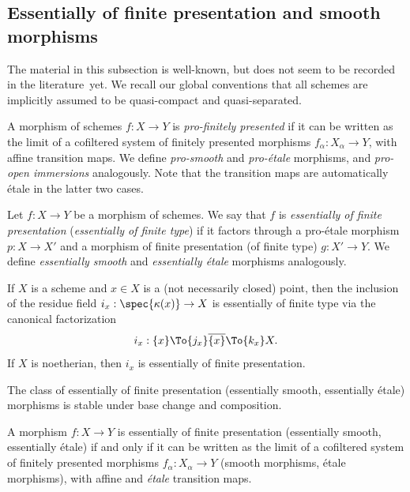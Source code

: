 \subsection{Essentially of finite presentation and smooth morphisms}

The material in this subsection is well-known, but does not seem to be recorded in the literature~yet.
We recall our global conventions that all schemes are implicitly assumed to be quasi-compact and quasi-separated.

\begin{df}\label{df:pro-etale}
A morphism of schemes $f : X \to Y$ is \emph{pro-finitely presented} if it can be written as the limit of a cofiltered system of finitely presented morphisms $f_\alpha : X_\alpha \to Y$, with affine transition maps.
We define \emph{pro-smooth} and \emph{pro-étale} morphisms, and \emph{pro-open immersions} analogously.
Note that the transition maps are automatically étale in the latter two cases.
\end{df}

\begin{df}\label{df:efp}
Let $f : X \to Y$ be a morphism of schemes.
We say that $f$ is \emph{essentially of finite presentation} (\resp \emph{essentially of finite type}) if it factors through a pro-étale morphism $p : X \to X'$ and a morphism of finite presentation (\resp of finite type) $g : X' \to Y$.
We define \emph{essentially smooth} and \emph{essentially étale} morphisms analogously.
\end{df}

\begin{ex}\label{ex:residue efp}
If $X$ is a scheme and $x \in X$ is a (not necessarily closed) point, then the inclusion of the residue field $i_x : \spec{\kappa(x)} \to X$ is essentially of finite type via the canonical factorization
\[
i_x : \{x\}
\To{j_x} \overline{\{x\}}
\To{k_x} X.
\]
If $X$ is noetherian, then $i_x$ is essentially of finite presentation.
\end{ex}

\begin{prop}\label{prop:efp compose}
The class of essentially of finite presentation (\resp essentially smooth, essentially étale) morphisms is stable under base change and composition.
\end{prop}

\begin{prop}\label{prop:pro-fp=efp}
A morphism $f : X \to Y$ is essentially of finite presentation (\resp essentially smooth, essentially étale) if and only if it can be written as the limit of a cofiltered system of finitely presented morphisms $f_\alpha : X_\alpha \to Y$ (\resp smooth morphisms, étale morphisms), with affine and \emph{étale} transition maps.
\end{prop}

